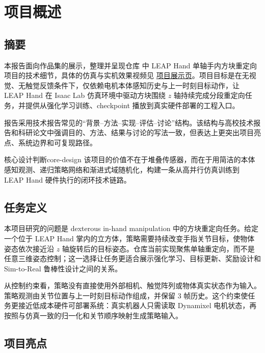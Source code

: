 \section{项目概述}

\subsection{摘要}

本报告面向作品集的展示，整理并呈现仓库 \href{https://github.com/CQULeaf/leap-hand-inhand-reorientation}{} 中 LEAP Hand 单轴手内方块重定向项目的技术细节，具体的仿真与实机效果视频见 \href{https://yexuhang.com/projects/leap-hand-inhand-reorientation}{项目展示页}。项目目标是在无视觉、无触觉反馈条件下，仅依赖电机本体感知历史与上一时刻目标动作，让 LEAP Hand 在 Isaac Lab 仿真环境中驱动方块围绕 $z$ 轴持续完成分段重定向任务，并提供从强化学习训练、checkpoint 播放到真实硬件部署的工程入口。

报告采用技术报告常见的“背景--方法--实现--评估--讨论”结构。该结构与高校技术报告和科研论文中强调目的、方法、结果与讨论的写法一致\cite{melbourneTechReports,cmuImrd}，但表达上更突出项目亮点、系统边界和可复现路径。

\begin{definition}{核心设计判断}{core-design}
该项目的价值不在于堆叠传感器，而在于用简洁的本体感知观测、递归策略网络和渐进式域随机化，构建一条从高并行仿真训练到 LEAP Hand 硬件执行的闭环技术链路。
\end{definition}

\subsection{任务定义}

本项目研究的问题是 dexterous in-hand manipulation 中的方块重定向任务。给定一个位于 LEAP Hand 掌内的立方体，策略需要持续改变手指关节目标，使物体姿态依次接近沿 $z$ 轴旋转后的目标姿态。仓库当前实现聚焦单轴重定向，而不是任意三维姿态控制；这一选择让任务更适合展示强化学习、目标更新、奖励设计和 Sim-to-Real 鲁棒性设计之间的关系。

从控制约束看，策略没有直接使用外部相机、触觉阵列或物体真实状态作为输入。策略观测由关节位置与上一时刻目标动作组成，并保留 3 帧历史。这个约束使任务更接近低成本硬件可部署系统：真实机器人只需读取 Dynamixel 电机状态，再按照与仿真一致的归一化和关节顺序映射生成策略输入。

\subsection{项目亮点}

